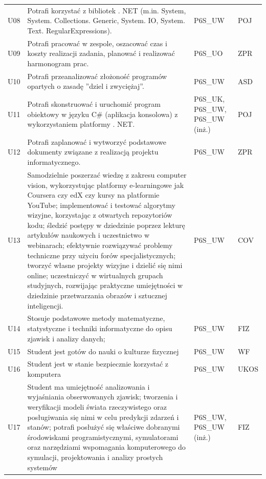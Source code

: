 \documentclass[12pt,a4paper]{article}
\begin{document}
{\begin{longtable}{m{1cm}m{8.8cm}m{2.1cm}m{2.5cm}}
\rowcolor{tableRowAlt} U08 & Potrafi korzystać z bibliotek . NET (m.in. System, System. Collections. Generic, System. IO, System. Text. RegularExpressions). & {\scriptsize P6S\_UW} & {\scriptsize POJ} \\
\rowcolor{tableRowLight} U09 & Potrafi pracować w zespole, oszacować czas i koszty realizacji zadania, planować i realizować harmonogram prac. & {\scriptsize P6S\_UO} & {\scriptsize ZPR} \\
\rowcolor{tableRowAlt} U10 & Potrafi przeanalizować złożoność programów opartych o zasadę ''dziel i zwyciężaj''. & {\scriptsize P6S\_UW} & {\scriptsize ASD} \\
\rowcolor{tableRowLight} U11 & Potrafi skonstruować i uruchomić program obiektowy w języku C\# (aplikacja konsolowa) z wykorzystaniem platformy . NET. & {\scriptsize P6S\_UK, P6S\_UW, P6S\_UW {\scriptsize (inż.)}} & {\scriptsize POJ} \\
\rowcolor{tableRowAlt} U12 & Potrafi zaplanować i wytworzyć podstawowe dokumenty związane z realizacją projektu informatycznego. & {\scriptsize P6S\_UW} & {\scriptsize ZPR} \\
\rowcolor{tableRowLight} U13 & Samodzielnie poszerzać wiedzę z zakresu computer vision, wykorzystując platformy e-learningowe jak Coursera czy edX czy kursy na platformie YouTube; implementować i testować algorytmy wizyjne, korzystając z otwartych repozytoriów kodu; śledzić postępy w dziedzinie poprzez lekturę artykułów naukowych i uczestnictwo w webinarach; efektywnie rozwiązywać problemy techniczne przy użyciu forów specjalistycznych; tworzyć własne projekty wizyjne i dzielić się nimi online; uczestniczyć w wirtualnych grupach studyjnych, rozwijając praktyczne umiejętności w dziedzinie przetwarzania obrazów i sztucznej inteligencji. & {\scriptsize P6S\_UW} & {\scriptsize COV} \\
\rowcolor{tableRowAlt} U14 & Stosuje podstawowe metody matematyczne, statystyczne i techniki informatyczne do opisu zjawisk i analizy danych; & {\scriptsize P6S\_UW} & {\scriptsize FIZ} \\
\rowcolor{tableRowLight} U15 & Student jest gotów do nauki o kulturze fizycznej & {\scriptsize P6S\_UW} & {\scriptsize WF} \\
\rowcolor{tableRowAlt} U16 & Student jest w stanie bezpiecznie korzystać z komputera & {\scriptsize P6S\_UW} & {\scriptsize UKOS} \\
\rowcolor{tableRowLight} U17 & Student ma umiejętność analizowania i wyjaśniania obserwowanych zjawisk; tworzenia i weryfikacji modeli świata rzeczywistego oraz posługiwania się nimi w celu predykcji zdarzeń i stanów; potrafi posłużyć się właściwe dobranymi środowiskami programistycznymi, symulatorami oraz narzędziami wspomagania komputerowego do symulacji, projektowania i analizy prostych systemów & {\scriptsize P6S\_UW, P6S\_UW {\scriptsize (inż.)}} & {\scriptsize FIZ} \\

\end{longtable}}
\end{document}
